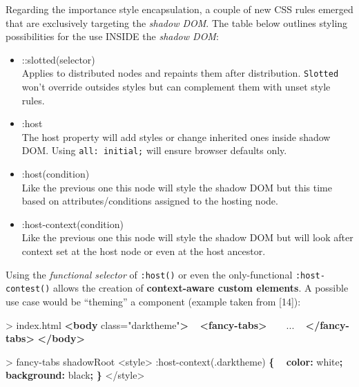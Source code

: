 \documentclass[]{assets/latex/ieee}
\newenvironment{Shaded}{}{}
\newcommand{\KeywordTok}[1]{\textcolor[rgb]{0.00,0.44,0.13}{\textbf{{#1}}}}
\newcommand{\DataTypeTok}[1]{\textcolor[rgb]{0.56,0.13,0.00}{{#1}}}
\newcommand{\DecValTok}[1]{\textcolor[rgb]{0.25,0.63,0.44}{{#1}}}
\newcommand{\FloatTok}[1]{\textcolor[rgb]{0.25,0.63,0.44}{{#1}}}
\newcommand{\StringTok}[1]{\textcolor[rgb]{0.25,0.44,0.63}{{#1}}}
\newcommand{\OtherTok}[1]{\textcolor[rgb]{0.00,0.44,0.13}{{#1}}}
\newcommand{\ErrorTok}[1]{\textcolor[rgb]{1.00,0.00,0.00}{\textbf{{#1}}}}
\newcommand{\NormalTok}[1]{{#1}}
\providecommand{\tightlist}{%
  \setlength{\itemsep}{0pt}\setlength{\parskip}{0pt}}
\begin{document}
Regarding the importance style encapsulation, a couple of new CSS rules
emerged that are exclusively targeting the \emph{shadow DOM}. The table
below outlines styling possibilities for the use INSIDE the \emph{shadow
DOM}:

\begin{itemize}
\tightlist
\item
  ::slotted(selector)\\
  Applies to distributed nodes and repaints them after distribution.
  \texttt{Slotted} won't override outsides styles but can complement
  them with unset style rules.
\item
  :host\\
  The host property will add styles or change inherited ones inside
  shadow DOM. Using \texttt{all:\ initial;} will ensure browser defaults
  only.
\item
  :host(condition)\\
  Like the previous one this node will style the shadow DOM but this
  time based on attributes/conditions assigned to the hosting node.
\item
  :host-context(condition)\\
  Like the previous one this node will style the shadow DOM but will
  look after context set at the host node or even at the host ancestor.
\end{itemize}

Using the \emph{functional selector} of \texttt{:host()} or even the
only-functional \texttt{:host-contest()} allows the creation of
\textbf{context-aware custom elements}. A possible use case would be
``theming'' a component (example taken from {[}14{]}):

\begin{Shaded}
\begin{Highlighting}[]
\NormalTok{> index.html}
\KeywordTok{<body}\OtherTok{ class=}\StringTok{"darktheme"}\KeywordTok{>}
  \KeywordTok{<fancy-tabs>}
    \NormalTok{...}
  \KeywordTok{</fancy-tabs>}
\KeywordTok{</body>}
\end{Highlighting}
\end{Shaded}

\begin{Shaded}
\begin{Highlighting}[]
\NormalTok{> fancy-tabs shadowRoot}
\NormalTok{<style>}
\DecValTok{:}\NormalTok{host-context(}\FloatTok{.darktheme}\NormalTok{) }\KeywordTok{\{}
\ErrorTok{ } \KeywordTok{color:} \DataTypeTok{white}\KeywordTok{;}
\ErrorTok{ } \KeywordTok{background:} \DataTypeTok{black}\KeywordTok{;}
\KeywordTok{\}}
\NormalTok{</style>}
\end{Highlighting}
\end{Shaded}
\end{document}
